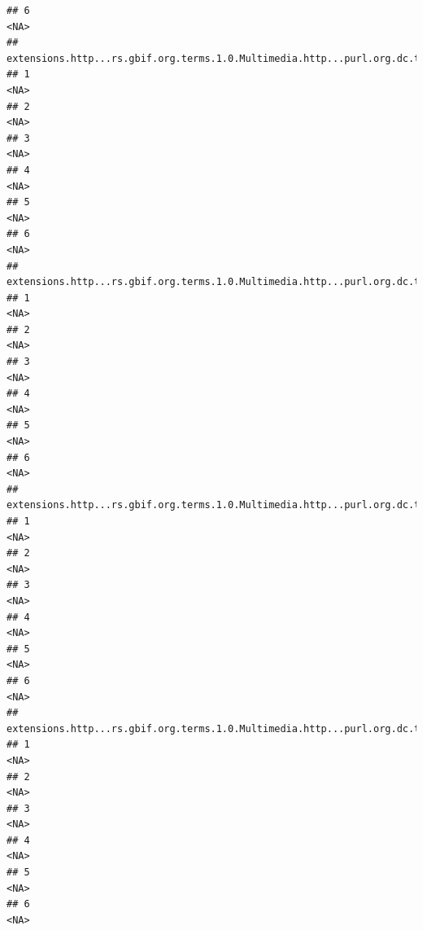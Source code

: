 \documentclass[
]{book}
\begin{document}
\begin{verbatim}
## 6                                                                                    <NA>
##   extensions.http...rs.gbif.org.terms.1.0.Multimedia.http...purl.org.dc.terms.license.2
## 1                                                                                  <NA>
## 2                                                                                  <NA>
## 3                                                                                  <NA>
## 4                                                                                  <NA>
## 5                                                                                  <NA>
## 6                                                                                  <NA>
##   extensions.http...rs.gbif.org.terms.1.0.Multimedia.http...purl.org.dc.terms.created.2
## 1                                                                                  <NA>
## 2                                                                                  <NA>
## 3                                                                                  <NA>
## 4                                                                                  <NA>
## 5                                                                                  <NA>
## 6                                                                                  <NA>
##   extensions.http...rs.gbif.org.terms.1.0.Multimedia.http...purl.org.dc.terms.format.2
## 1                                                                                 <NA>
## 2                                                                                 <NA>
## 3                                                                                 <NA>
## 4                                                                                 <NA>
## 5                                                                                 <NA>
## 6                                                                                 <NA>
##   extensions.http...rs.gbif.org.terms.1.0.Multimedia.http...purl.org.dc.terms.references.2
## 1                                                                                     <NA>
## 2                                                                                     <NA>
## 3                                                                                     <NA>
## 4                                                                                     <NA>
## 5                                                                                     <NA>
## 6                                                                                     <NA>

\end{verbatim}
\end{document}
